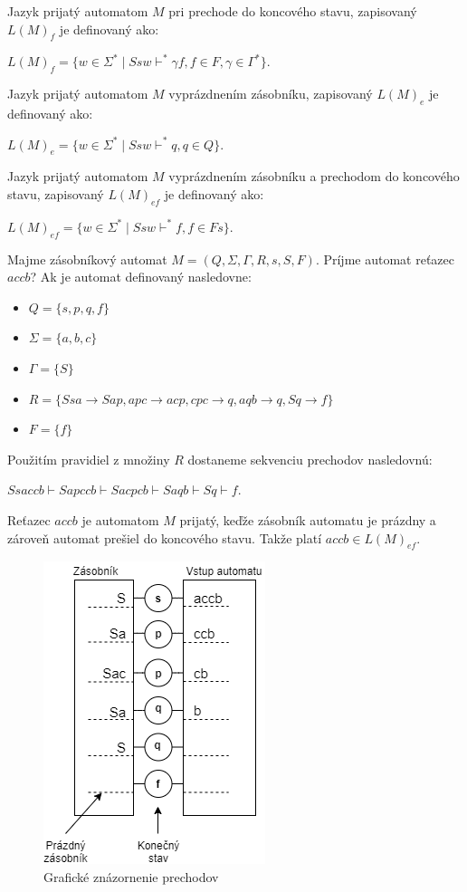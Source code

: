 Jazyk prijatý automatom $M$ pri prechode do koncového stavu, zapisovaný $L(M)_f$ je definovaný ako: 
\begin{center}
$L(M)_f = \{w \in \Sigma^\ast \mid Ssw \vdash^\ast \gamma f, f \in F, \gamma \in \Gamma^\ast\}$.
\end{center}
Jazyk prijatý automatom $M$ vyprázdnením zásobníku, zapisovaný $L(M)_e$ je definovaný ako: 
\begin{center}
$L(M)_e = \{w \in \Sigma^\ast \mid Ssw \vdash^\ast q, q \in Q\}$.
\end{center}
Jazyk prijatý automatom $M$ vyprázdnením zásobníku a prechodom do koncového stavu, zapisovaný $L(M)_{ef}$ je definovaný ako: 
\begin{center}
$L(M)_{ef} = \{w \in \Sigma^\ast \mid Ssw \vdash^\ast f, f \in Fs\}$.
\end{center}



\begin{theorem}
\normalfont Majme zásobníkový automat $M = (Q, \Sigma, \Gamma, R, s, S, F)$. Príjme automat reťazec $accb$? Ak je automat definovaný nasledovne:
\begin{itemize}
\item $Q = \{s, p, q, f\}$
\item $\Sigma = \{a,b, c\}$
\item $\Gamma = \{S\}$
\item $R = \{Ssa \to Sap, apc \to acp, cpc \to q, aqb \to q, Sq \to f\}$ 
\item $F = \{f\}$
\end{itemize} 
Použitím pravidiel z množiny $R$ dostaneme sekvenciu prechodov nasledovnú:
\begin{center}
$Ssaccb \vdash Sapccb \vdash Sacpcb \vdash Saqb \vdash Sq \vdash f$.
\end{center}
Reťazec $accb$ je automatom $M$ prijatý, keďže zásobník automatu je prázdny a zároveň automat prešiel do koncového stavu. Takže platí $accb \in L(M)_{ef}$.
\begin{figure}[!ht]
\centering
\includegraphics[scale =0.7]{obrazky-figures/schema.png}
\caption{Grafické znázornenie prechodov}
\end{figure}
\end{theorem}




